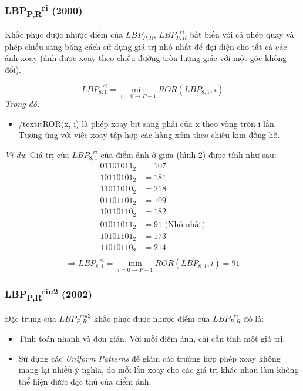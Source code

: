 \subsubsection{LBP\textsubscript{P,R}\textsuperscript{ri} (2000)}
Khắc phục được nhược điểm của $LBP_{P,R}$, $LBP_{P,R}^{\text{  }ri}$ bất biến với cả phép quay và phép chiếu sáng bằng cách sử dụng giá trị nhỏ nhất để đại diện cho tất cả các ảnh xoay (ảnh được xoay theo chiều đường tròn lượng giác với một góc không đổi).

\begin{equation}
	LBP_{8,1}^{\text{  }ri} = \min_{i=0 \to P-1}{ROR(LBP_{8,1}, i)}
\end{equation}
\textit{Trong đó:}
\begin{itemize}
	\item /textit{ROR(x, i)} là phép xoay bit sang phải của x theo vòng tròn i lần. Tương ứng với việc xoay tập hợp các hàng xóm theo chiều kim đồng hồ.
\end{itemize}

\textit{Ví dụ}: Giá trị của $LBP_{8,1}^{\text{  }ri}$ của điểm ảnh ở giữa (hình 2) được tính như sau:
\begin{align*}
	01101011_2 &= 107\\
	10110101_2 &= 181\\
	11011010_2 &= 218\\
	01101101_2 &= 109\\
	10110110_2 &= 182\\
	01011011_2 &= 91  \text{   (Nhỏ nhất)}\\
	10101101_2 &= 173\\
	11010110_2 &= 214\\
\end{align*}
$$
	\Longrightarrow LBP_{8,1}^{\text{  }ri} = \min_{i=0 \to P-1}{ROR(LBP_{8,1}, i)} = 91
$$
\subsubsection{LBP\textsubscript{P,R}\textsuperscript{riu2} (2002)}

Đặc trưng của $LBP_{P,R}^{\text{  }riu2}$ khắc phục được nhược điểm của $LBP_{P,R}^{\text{  }ri}$ đó là:
\begin{itemize}
	\item Tính toán nhanh và đơn giản. Với mỗi điểm ảnh, chỉ cần tính một giá trị.
	\item Sử dụng các \textit{Uniform Patterns} để  giảm các trường hợp phép xoay không mang lại nhiều ý nghĩa, do mỗi lần xoay cho các giá trị khác nhau làm không thể hiện đươc đặc thù của điểm ảnh.
\end{itemize}
\pagebreak

